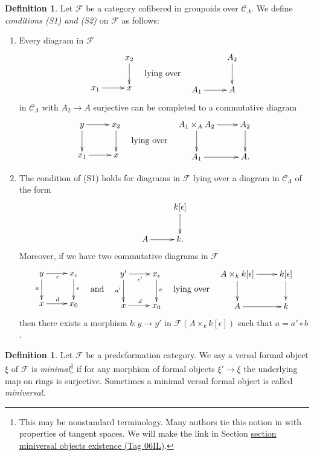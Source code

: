 \documentclass{amsart}
\theoremstyle{plain}
\theoremstyle{definition}
\newtheorem{definition}[subsection]{Definition}
\theoremstyle{remark}
\numberwithin{equation}{subsection}
\begin{document}
\begin{definition}
\label{definition-S1-S2}
Let $\mathcal{F}$ be a category cofibered in groupoids over $\mathcal
C_\Lambda$. We define {\it conditions (S1) and (S2)}
on $\mathcal{F}$ as follows:
\begin{enumerate}
\item[(S1)] Every diagram in $\mathcal{F}$
$$
\vcenter{
\xymatrix{
           & x_2 \ar[d] \\
x_1 \ar[r] & x
}
}
\quad\text{lying over}\quad
\vcenter{
\xymatrix{
           & A_2 \ar[d] \\
A_1 \ar[r] & A
}
}
$$
in $\mathcal{C}_\Lambda$ with $A_2 \to A$ surjective can be completed
to a commutative diagram
$$
\vcenter{
\xymatrix{
y \ar[r] \ar[d] & x_2 \ar[d] \\
x_1 \ar[r]      & x
}
}
\quad\text{lying over}\quad
\vcenter{
\xymatrix{
A_1 \times_A A_2 \ar[r] \ar[d] & A_2 \ar[d] \\
A_1 \ar[r]      & A.
}
}
$$
\item[(S2)]
The condition of (S1) holds for diagrams in $\mathcal{F}$ lying over
a diagram in $\mathcal{C}_\Lambda$ of the form
$$
\xymatrix{
          & k[\epsilon] \ar[d] \\
A  \ar[r] & k.
}
$$
Moreover, if we have two commutative diagrams in $\mathcal{F}$
$$
\vcenter{
\xymatrix{
y \ar[r]_c \ar[d]_a & x_\epsilon \ar[d]^e \\
x \ar[r]^d          & x_0
}
}
\quad\text{and}\quad
\vcenter{
\xymatrix{
y' \ar[r]_{c'} \ar[d]_{a'} & x_\epsilon \ar[d]^e \\
x \ar[r]^d                 & x_0
}
}
\quad\text{lying over}\quad
\vcenter{
\xymatrix{
A \times_k k[\epsilon] \ar[r] \ar[d] & k[\epsilon] \ar[d] \\
A  \ar[r] & k
}
}
$$
then there exists a morphism $b : y \to y'$ in
$\mathcal{F}(A \times_k k[\epsilon])$ such that $a = a' \circ b$.
\end{enumerate}
\end{definition}

\begin{definition}
\label{definition-minimal-versal}
Let $\mathcal{F}$ be a predeformation category.
We say a versal formal object $\xi$ of $\mathcal{F}$ is
{\it minimal}\footnote{This may be nonstandard terminology. Many
authors tie this notion in with properties of tangent spaces.
We will make the link in
Section \href{https://stacks.math.columbia.edu/tag/06IL}{section miniversal objects existence (Tag 06IL)}.}
if for any morphism of formal objects
$\xi' \to \xi$ the underlying map on rings is surjective.
Sometimes a minimal versal formal object is called {\it miniversal}.
\end{definition}
\end{document}
